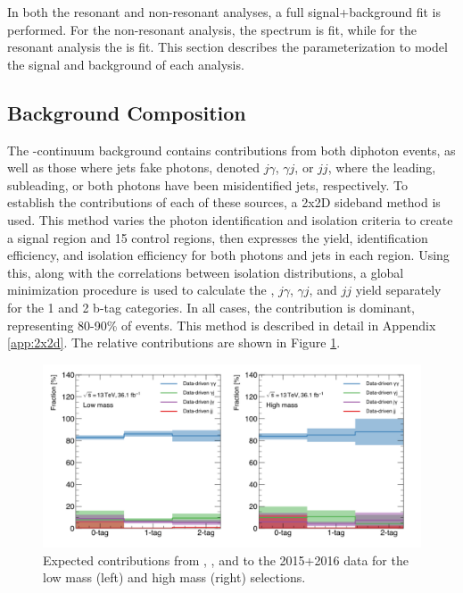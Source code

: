In both the resonant and non-resonant analyses, a full signal+background fit is performed. For the non-resonant analysis, the \myy spectrum is fit, while for the resonant analysis the \myybb is fit. This section describes the parameterization to model the signal and background of each analysis.

\subsection{Background Composition} \label{ssec:background-composition}

The \yy-continuum background contains contributions from both diphoton events, as well as those where jets fake photons, denoted $j\gamma$, $\gamma j$, or $jj$, where the leading, subleading, or both photons have been misidentified jets, respectively. To establish the contributions of each of these sources, a 2x2D sideband method \cite{2x2d-sideband} is used. This method varies the photon identification and isolation criteria to create a signal region and 15 control regions, then expresses the yield, identification efficiency, and isolation efficiency for both photons and jets in each region. Using this, along with the correlations between isolation distributions, a global minimization procedure is used to calculate the \yy, $j\gamma$, $\gamma j$, and $jj$ yield separately for the 1 and 2 b-tag categories. In all cases, the \yy contribution is dominant, representing 80-90\% of events. This method is described in detail in Appendix \ref{app:2x2d}. The relative contributions are shown in Figure \ref{fig:background_fractions}.


\begin{figure}[b!]
  \centering
  \includegraphics[width=\textwidth]{chapters/chapter5_yybb/images/2x2d/expected_contribution_clean.pdf}
  \caption{Expected contributions from \yy, \yj, \jy and \jj to the 2015+2016 data for the low mass (left) and high mass (right) selections.
    \label{fig:background_fractions}}
\end{figure}


